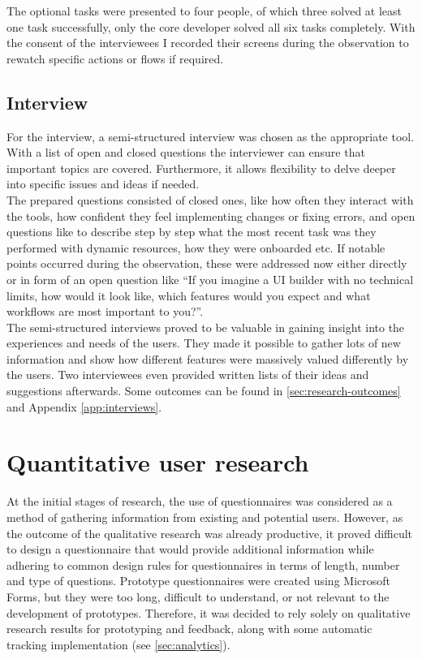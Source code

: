 The optional tasks were presented to four people, of which three solved at least one task successfully, only the core developer solved all six tasks completely.
With the consent of the interviewees I recorded their screens during the observation to rewatch specific actions or flows if required.

\subsection{Interview}
\label{subsec:interview}
For the interview, a semi-structured interview was chosen as the appropriate tool.
With a list of open and closed questions the interviewer can ensure that important topics are covered.
Furthermore, it allows flexibility to delve deeper into specific issues and ideas if needed.
\\
The prepared questions consisted of closed ones, like how often they interact with the tools, how confident they feel implementing changes or fixing errors, and open questions like to describe step by step what the most recent task was they performed with dynamic resources, how they were onboarded etc.
If notable points occurred during the observation, these were addressed now either directly or in form of an open question like ``If you imagine a UI builder with no technical limits, how would it look like, which features would you expect and what workflows are most important to you?''.
\\
The semi-structured interviews proved to be valuable in gaining insight into the experiences and needs of the users. They made it possible to gather lots of new information and show how different features were massively valued differently by the users. Two interviewees even provided written lists of their ideas and suggestions afterwards.
Some outcomes can be found in \ref{sec:research-outcomes} and Appendix \ref{app:interviews}.

\section{Quantitative user research}

At the initial stages of research, the use of questionnaires was considered as a method of gathering information from existing and potential users.
However, as the outcome of the qualitative research was already productive, it proved difficult to design a questionnaire that would provide additional information while adhering to common design rules for questionnaires in terms of length, number and type of questions.
Prototype questionnaires were created using Microsoft Forms, but they were too long, difficult to understand, or not relevant to the development of prototypes.
Therefore, it was decided to rely solely on qualitative research results for prototyping and feedback, along with some automatic tracking implementation (see \ref{sec:analytics}).
\\
